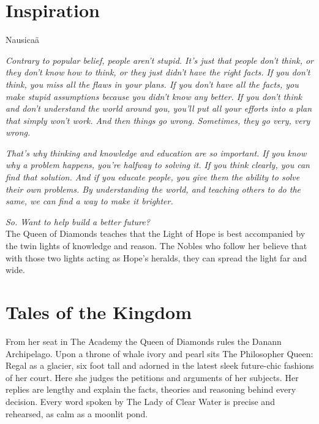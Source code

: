 \section*{Inspiration}

Nausica\"{a}

\newpage{}

\noindent\textit{Contrary to popular belief, people aren't stupid. It's just that people don't think, or they don't know how to think, or they just didn't have the right facts. If you don't think, you miss all the flaws in your plans. If you don't have all the facts, you make stupid assumptions because you didn't know any better. If you don't think and don't understand the world around you, you'll put all your efforts into a plan that simply won't work. And then things go wrong. Sometimes, they go very, very wrong.}

\textit{That's why thinking and knowledge and education are so important. If you know why a problem happens, you're halfway to solving it. If you think clearly, you can find that solution. And if you educate people, you give them the ability to solve their own problems. By understanding the world, and teaching others to do the same, we can find a way to make it brighter.}

\textit{So. Want to help build a better future?}\\

\noindent The Queen of Diamonds teaches that the Light of Hope is best accompanied by the twin lights of knowledge and reason. The Nobles who follow her believe that with those two lights acting as Hope's heralds, they can spread the light far and wide.

\section*{Tales of the Kingdom}

From her seat in The Academy the Queen of Diamonds rules the Danann Archipelago. Upon a throne of whale ivory and pearl sits The Philosopher Queen: Regal as a glacier, six foot tall and adorned in the latest sleek future-chic fashions of her court. Here she judges the petitions and arguments of her subjects. Her replies are lengthy and explain the facts, theories and reasoning behind every decision. Every word spoken by The Lady of Clear Water is precise and rehearsed, as calm as a moonlit pond.

